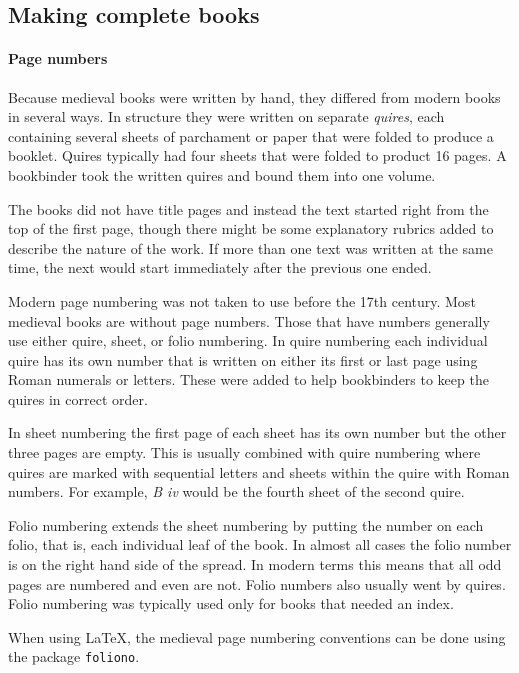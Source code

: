 \documentclass[a4paper]{article}
\newcommand{\package}[1]{\texttt{#1}}
\begin{document}
\subsection{Making complete books} 

\paragraph{Page numbers}

Because medieval books were written by hand, they differed from modern
books in several ways. In structure they were written on separate
\emph{quires}, each containing several sheets of parchament or paper
that were folded to produce a booklet. Quires typically had four
sheets that were folded to product 16 pages. A bookbinder took the
written quires and bound them into one volume.

The books did not have title pages and instead the text started right
from the top of the first page, though there might be some explanatory
rubrics added to describe the nature of the work. If more than one
text was written at the same time, the next would start immediately
after the previous one ended.

Modern page numbering was not taken to use before the 17th century.
Most medieval books are without page numbers. Those that have numbers
generally use either quire, sheet, or folio numbering. In quire
numbering each individual quire has its own number that is written on
either its first or last page using Roman numerals or letters. These
were added to help bookbinders to keep the quires in correct order.

In sheet numbering the first page of each sheet has its own number but
the other three pages are empty. This is usually combined with quire
numbering where quires are marked with sequential letters and sheets
within the quire with Roman numbers. For example, \emph{B iv} would be
the fourth sheet of the second quire. 

Folio numbering extends the sheet numbering by putting the number on
each folio, that is, each individual leaf of the book. In almost all
cases the folio number is on the right hand side of the spread. In
modern terms this means that all odd pages are numbered and even are
not. Folio numbers also usually went by quires. Folio numbering was
typically used only for books that needed an index.

When using LaTeX, the medieval page numbering conventions can be done
using the package \package{foliono}. 
\end{document}
